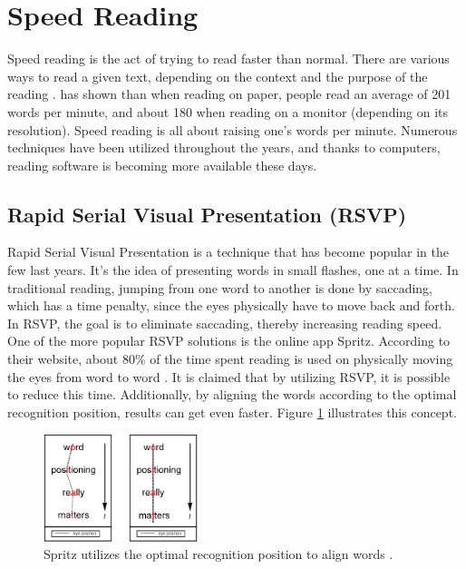 \section{Speed Reading}
Speed reading is the act of trying to read faster than normal. There are various ways to read a given text, depending on the context and the purpose of the reading \cite{differentWaysOfReading}.  has shown than when reading on paper, people read an average of 201 words per minute, and about 180 when reading on a monitor (depending on its resolution). Speed reading is all about raising one's words per minute. Numerous techniques have been utilized throughout the years, and  thanks to computers, reading software is becoming more available these days.


\subsection{Rapid Serial Visual Presentation (RSVP)}
Rapid Serial Visual Presentation is a technique that has become popular in the few last years. It's the idea of presenting words in small flashes, one at a time. In traditional reading, jumping from one word to another is done by saccading, which has a time penalty, since the eyes physically have to move back and forth. In RSVP, the goal is to eliminate saccading, thereby increasing reading speed. One of the more popular RSVP solutions is the online app Spritz. According to their website, about 80\% of the time spent reading is used on physically moving the eyes from word to word \cite{spritz}.	It is claimed that by utilizing RSVP, it is possible to reduce this time. Additionally, by aligning the words according to the optimal recognition position, results can get even faster. Figure \ref{fig:spritz_orp} illustrates this concept.

\begin{figure}[htbp]
\centering
\includegraphics[width=0.4\textwidth]{Pics/opr_spritz}
\caption{Spritz utilizes the optimal recognition position to align words \protect\cite{spritz}.}
\label{fig:spritz_orp}
\end{figure}
